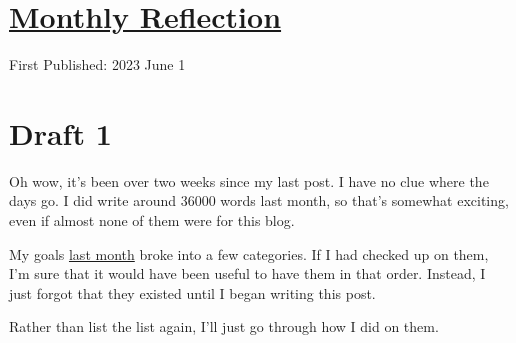\documentclass[12pt]{article}[titlepage]
\renewcommand{\,}{\textsuperscript{,}}
\begin{document}
\doublespacing
\section{\href{reflection-may-23.html}{Monthly Reflection}}
First Published: 2023 June 1

\section{Draft 1}
Oh wow, it's been over two weeks since my last post.
I have no clue where the days go.
I did write around 36000 words last month, so that's somewhat exciting, even if almost none of them were for this blog.

My goals \href{reflection-april-23.html}{last month} broke into a few categories.
If I had checked up on them, I'm sure that it would have been useful to have them in that order.
Instead, I just forgot that they existed until I began writing this post.

Rather than list the list again, I'll just go through how I did on them.
\end{document}
